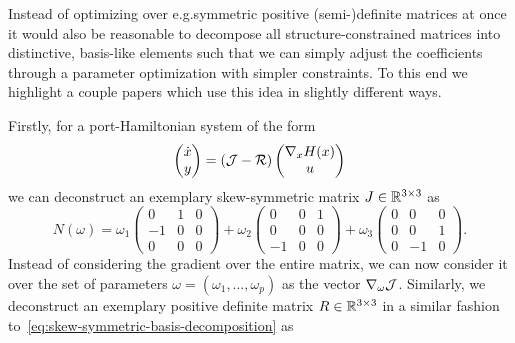 
Instead of optimizing over e.\@ g.\@ symmetric positive (semi-)definite matrices at once it would also be reasonable to decompose all structure-constrained matrices into distinctive, basis-like elements such that we can simply adjust the coefficients through a parameter optimization with simpler constraints.
To this end we highlight a couple papers which use this idea in slightly different ways.

Firstly, for a port-Hamiltonian system of the form
\begin{equation*}
    \begin{pmatrix}
        \dot{x} \\
        y
    \end{pmatrix} = (\mathcal{J} - \mathcal{R}) \begin{pmatrix}
        \nabla_x H(x) \\
        u
    \end{pmatrix}
\end{equation*}
we can deconstruct an exemplary skew-symmetric matrix $J \in \mathbb{R}^{3 \times 3}$ as
\begin{equation}\label{eq:skew-symmetric-basis-decomposition}
    N(\omega) = \omega_1 \begin{pmatrix}
        0 & 1 & 0 \\
        -1 & 0 & 0 \\
        0 & 0 & 0
    \end{pmatrix} + \omega_2 \begin{pmatrix}
        0 & 0 & 1 \\
        0 & 0 & 0 \\
        -1 & 0 & 0
    \end{pmatrix} + \omega_3 \begin{pmatrix}
        0 & 0 & 0 \\
        0 & 0 & 1 \\
        0 & -1 & 0
    \end{pmatrix}.
\end{equation}
Instead of considering the gradient over the entire matrix, we can now consider it over the set of parameters $\omega = (\omega_1, \dots, \omega_p)$ as the vector $\nabla_\omega \mathcal{J}$.
Similarly, we deconstruct an exemplary positive definite matrix $R \in \mathbb{R}^{3 \times 3}$ in a similar fashion to~\eqref{eq:skew-symmetric-basis-decomposition} as
